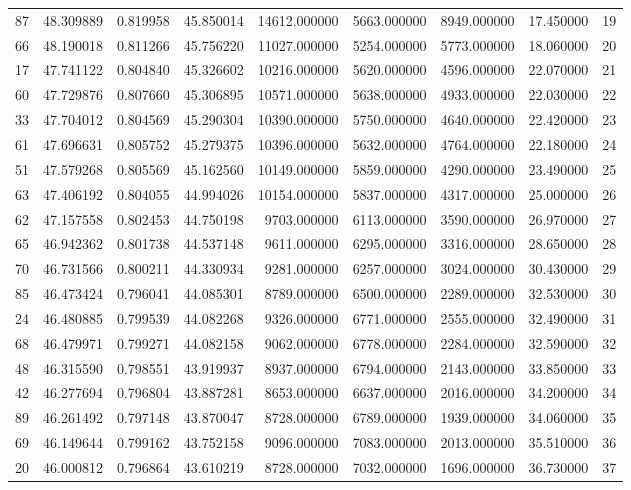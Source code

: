 \begin{tabular}{rrrrrrrrr}
87 & 48.309889 & 0.819958 & 45.850014 & 14612.000000 & 5663.000000 & 8949.000000 & 17.450000 & 19 \\
66 & 48.190018 & 0.811266 & 45.756220 & 11027.000000 & 5254.000000 & 5773.000000 & 18.060000 & 20 \\
17 & 47.741122 & 0.804840 & 45.326602 & 10216.000000 & 5620.000000 & 4596.000000 & 22.070000 & 21 \\
60 & 47.729876 & 0.807660 & 45.306895 & 10571.000000 & 5638.000000 & 4933.000000 & 22.030000 & 22 \\
33 & 47.704012 & 0.804569 & 45.290304 & 10390.000000 & 5750.000000 & 4640.000000 & 22.420000 & 23 \\
61 & 47.696631 & 0.805752 & 45.279375 & 10396.000000 & 5632.000000 & 4764.000000 & 22.180000 & 24 \\
51 & 47.579268 & 0.805569 & 45.162560 & 10149.000000 & 5859.000000 & 4290.000000 & 23.490000 & 25 \\
63 & 47.406192 & 0.804055 & 44.994026 & 10154.000000 & 5837.000000 & 4317.000000 & 25.000000 & 26 \\
62 & 47.157558 & 0.802453 & 44.750198 & 9703.000000 & 6113.000000 & 3590.000000 & 26.970000 & 27 \\
65 & 46.942362 & 0.801738 & 44.537148 & 9611.000000 & 6295.000000 & 3316.000000 & 28.650000 & 28 \\
70 & 46.731566 & 0.800211 & 44.330934 & 9281.000000 & 6257.000000 & 3024.000000 & 30.430000 & 29 \\
85 & 46.473424 & 0.796041 & 44.085301 & 8789.000000 & 6500.000000 & 2289.000000 & 32.530000 & 30 \\
24 & 46.480885 & 0.799539 & 44.082268 & 9326.000000 & 6771.000000 & 2555.000000 & 32.490000 & 31 \\
68 & 46.479971 & 0.799271 & 44.082158 & 9062.000000 & 6778.000000 & 2284.000000 & 32.590000 & 32 \\
48 & 46.315590 & 0.798551 & 43.919937 & 8937.000000 & 6794.000000 & 2143.000000 & 33.850000 & 33 \\
42 & 46.277694 & 0.796804 & 43.887281 & 8653.000000 & 6637.000000 & 2016.000000 & 34.200000 & 34 \\
89 & 46.261492 & 0.797148 & 43.870047 & 8728.000000 & 6789.000000 & 1939.000000 & 34.060000 & 35 \\
69 & 46.149644 & 0.799162 & 43.752158 & 9096.000000 & 7083.000000 & 2013.000000 & 35.510000 & 36 \\
20 & 46.000812 & 0.796864 & 43.610219 & 8728.000000 & 7032.000000 & 1696.000000 & 36.730000 & 37 \\

\end{tabular}
